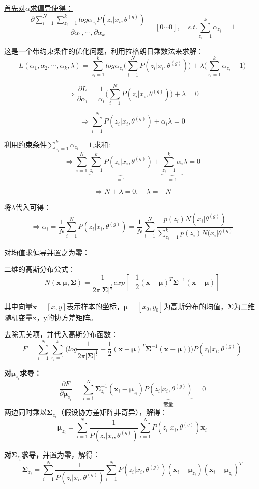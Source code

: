 \documentclass[UTF8]{ctexart} %
\begin{document}
			\uline{首先对$\alpha$求偏导使得：}
			\[\frac{\partial\sum_{i=1}^N\sum_{z_i=1}^klog\alpha_{z_i}P(z_i|x_i,\theta^{(g)})}{\partial\alpha_1,\cdots,\partial\alpha_k} = [0\cdots0],\quad s.t.\sum_{z_i=1}^k\alpha_{z_i}=1\]
			
			这是一个带约束条件的优化问题，利用拉格朗日乘数法来求解：
			\[L(\alpha_1,\alpha_2,\cdots,\alpha_k,\lambda) = \sum_{z_i=1}^klog\alpha_{z_i}\Bigg(\sum_{i=1}^NP(z_i|x_i,\theta^{(g)})\Bigg) +\lambda\Bigg(\sum_{z_i=1}^k\alpha_{z_i}-1\Bigg)\]
			
			\[\Longrightarrow \frac{\partial L}{\partial\alpha_i}  = \frac{1}{\alpha_i}\Bigg(\sum_{i=1}^NP(z_i|x_i,\theta^{(g)})\Bigg)+\lambda =0 \]
			
			\[\Longrightarrow\sum_{i=1}^NP(z_i|x_i,\theta^{(g)}) +\alpha_i\lambda=0\]
			
			利用约束条件$\sum_{z_i=1}^k\alpha_{z_i}=1$,求和:
			\[\Longrightarrow\sum_{i=1}^N\underbrace{\sum_{z_i=1}^kP(z_i|x_i,\theta^{(g)})}_{=1} +\underbrace{\sum_{z_i=1}^k\alpha_i}_{=1}\lambda=0\]
			
			\[\Longrightarrow N+\lambda =0, \quad \lambda=-N\]
			
			将$\lambda$代入可得：				
			\[\Longrightarrow \alpha_i = \frac{1}{N}\sum_{i=1}^NP(z_i|x_i,\theta^{(g)}) = \frac{1}{N}\sum_{i=1}^N\frac{p(z_i)N(x_i|\theta^{(g)})}{\sum_{z_{i}=1}^kp(z_i)N(x_i|\theta^{(g)}}\]
			
			\uline{对均值求偏导并置之为零：}
			
			二维的高斯分布公式：
			\[N(\bm{x}|\bm{\mu},\bm{\Sigma}) = \frac{1}{2\pi|\bm{\Sigma}|^{\frac{1}{2}}}exp[-\frac{1}{2}(\bm{x}-\bm{\mu})^T\bm{\Sigma}^{-1}(\bm{x}-\bm{\mu})]\]
			
			其中向量$\bm{x}=[x,y]$表示样本的坐标，$\bm{\mu}=[x_0,y_0]$为高斯分布的均值，$\bm{\Sigma}$为二维随机变量x，y的协方差矩阵。
			
			去除无关项，并代入高斯分布函数：
			\[F = \sum_{i=1}^N\sum_{z_i=1}^k\Big(log\frac{1}{2\pi|\bm{\Sigma}|^{\frac{1}{2}}}-\frac{1}{2}(\bm{x}-\bm{\mu})^T\bm{\Sigma}^{-1}(\bm{x}-\bm{\mu}))\Big)
			P(z_i|x_i,\theta^{(g)})\]
			
			\textbf{对$\bm{\mu}_{z_i}$求导：}
			\[\frac{\partial F}{\partial \bm{\mu}_{z_i}} = \sum_{i=1}^N\bm{\Sigma}_{z_i}^{-1}(\bm{x}_i-\bm{\mu}_{z_i})\underbrace{P(z_i|x_i,\theta^{(g)})}_{\text{常量}}=0\]
			两边同时乘以$\bm{\Sigma}_{z_i}$（假设协方差矩阵非奇异），解得：
				\[\bm{\mu}_{z_i} = \sum_{i=1}^N\frac{1}{P(z_i|x_i,\theta^{(g)})} \sum_{i=1}^{N}P(z_i|x_i,\theta^{(g)})\bm{x}_i\]
				
			\textbf{对$\bm{\Sigma}_{z_i}$求导，}并置为零，解得：
			\[\bm{\Sigma}_{z_i} = \sum_{i=1}^N\frac{1}{P(z_i|x_i,\theta^{(g)})} \sum_{i=1}^{N}P(z_i|x_i,\theta^{(g)})(\bm{x}_i-\bm{\mu}_{z_i})(\bm{x}_i-\bm{\mu}_{z_i})^T\]
				
				
			
		
			
			
\end{document}
